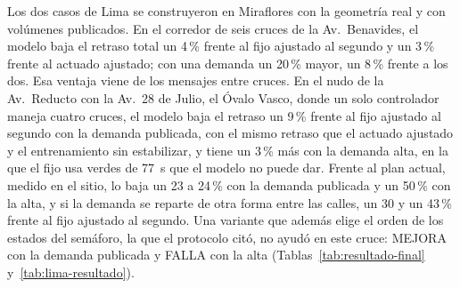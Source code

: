 Los dos casos de Lima se construyeron en Miraflores con la geometría
real y con volúmenes publicados. En el corredor de seis cruces de la
Av.~Benavides, el modelo baja el retraso total un 4\,\% frente al fijo ajustado al segundo y un
3\,\% frente al actuado ajustado; con una demanda un 20\,\% mayor, un
8\,\% frente a los dos. Esa ventaja viene de los mensajes entre cruces.
En el nudo de la Av.~Reducto con la Av.~28 de Julio, el
Óvalo Vasco, donde un solo controlador maneja cuatro cruces, el modelo
baja el retraso un 9\,\% frente al fijo ajustado al segundo con la
demanda publicada, con el mismo retraso que el actuado ajustado y el
entrenamiento sin estabilizar, y tiene un 3\,\% más con la demanda alta,
en la que el fijo usa verdes de 77~s que el modelo no puede dar. Frente
al plan actual, medido en el sitio, lo baja un 23 a 24\,\% con la
demanda publicada y un 50\,\% con la alta, y si la demanda se reparte de
otra forma entre las calles, un 30 y un 43\,\% frente al fijo ajustado
al segundo. Una variante que además elige el orden de los estados del
semáforo, la que el protocolo citó, no ayudó en este cruce: MEJORA con
la demanda publicada y FALLA con la alta
(Tablas~\ref{tab:resultado-final} y~\ref{tab:lima-resultado}).

